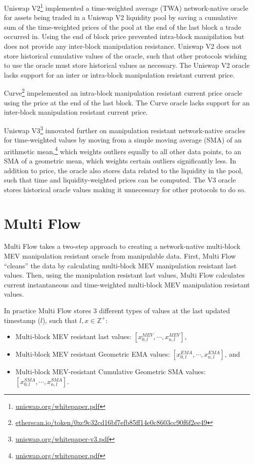 \documentclass[tikz]{article}
\newcommand{\fref}[1]{\footnote{\href{http://#1}{#1}}}
\begin{document}
Uniswap V2\fref{uniswap.org/whitepaper.pdf} implemented a time-weighted average (TWA) network-native oracle for assets being traded in a Uniswap V2 liquidity pool by saving a cumulative sum of the time-weighted prices of the pool at the end of the last block a trade occurred in. Using the end of block price prevented intra-block manipilation but does not provide any inter-block manipulation resistance. Uniswap V2 does not store historical cumulative values of the oracle, such that other protocols wishing to use the oracle must store historical values as necessary. The Uniswap V2 oracle lacks support for an inter or intra-block manipulation resistant current price. 

Curve\fref{etherscan.io/token/0xc9c32cd16bf7efb85ff14e0c8603cc90f6f2ee49} impelemented an intra-block manipulation resistant current price oracle using the price at the end of the last block. The Curve oracle lacks support for an inter-block manipulation resistant current price. 

Uniswap V3\fref{uniswap.org/whitepaper-v3.pdf} innovated further on manipulation resistant network-native oracles for time-weighted values by moving from a simple moving average (SMA) of an arithmetic mean,\fref{uniswap.org/whitepaper.pdf} which weights outliers equally to all other data points, to an SMA of a geometric mean, which weights certain outliers significantly less. In addition to price, the oracle also stores data related to the liquidity in the pool, such that time and liquidity-weighted prices can be computed. The V3 oracle stores historical oracle values making it unnecessary for other protocols to do so. 

\section{Multi Flow}
Multi Flow takes a two-step approach to creating a network-native multi-block MEV manipulation resistant oracle from manipulable data. First, Multi Flow “cleans” the data by calculating multi-block MEV manipulation resistant last values. Then, using the manipulation resistant last values, Multi Flow calculates current instantaneous and time-weighted multi-block MEV manipulation resistant values. 

In practice Multi Flow stores 3 different types of values at the last updated timestamp ($l$), such that $l, x \in \mathbb{Z}^{+}$:
\begin{itemize}
\item Multi-block MEV resistant last values: $[x^{MEV}_{0,l}, \cdots, x^{MEV}_{n,l}]$,
\item Multi-block MEV resistant Geometric EMA values: $[x^{EMA}_{0,l}, \cdots, x^{EMA}_{n,l}]$, and
\item Multi-block MEV-resistant Cumulative Geometric SMA values: $[x^{SMA}_{0,l}, \cdots, x^{SMA}_{n,l}]$.
\end{itemize}
\end{document}
